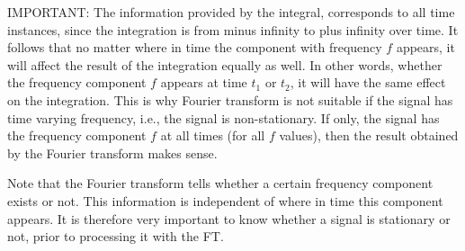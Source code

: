 \documentclass[12pt, a4paper, twoside]{report}
\begin{document}
IMPORTANT: The information provided by the integral, corresponds to all time instances, since the integration is from minus infinity to plus infinity over time. It follows that no matter where in time the component with frequency $f$ appears, it will affect the result of the integration equally as well. In other words, whether the frequency component $f$ appears at time $t_1$ or $t_2$, it will have the same effect on the integration. This is why Fourier transform is not suitable if the signal has time varying frequency, i.e., the signal is non-stationary. If only, the signal has the frequency component $f$ at all times (for all $f$ values), then the result obtained by the Fourier transform makes sense.
\par
Note that the Fourier transform tells whether a certain frequency component exists or not. This information is independent of where in time this component appears. It is therefore very important to know whether a signal is stationary or not, prior to processing it with the FT.
\end{document}
